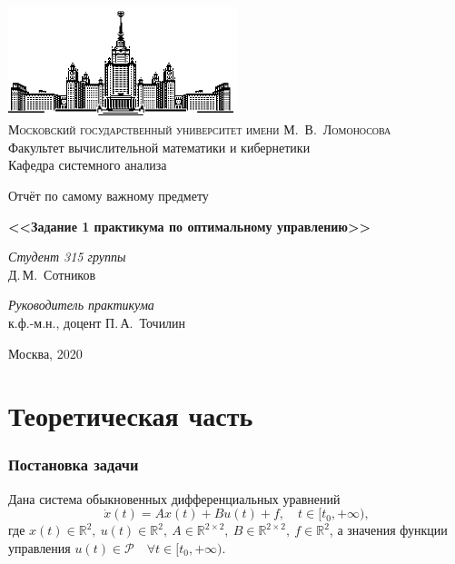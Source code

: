 \documentclass[11pt]{article}
\newcommand\Real{\mathbb{R}}
\newcommand\PS{\mathcal{P}}
\begin{document}
\thispagestyle{empty}

\begin{center}
\ \vspace{-3cm}

\includegraphics[width=0.5\textwidth]{msu.eps}\\
{\scshape Московский государственный университет имени М.~В.~Ломоносова}\\
Факультет вычислительной математики и кибернетики\\
Кафедра системного анализа

\vfill

{\LARGE Отчёт по самому важному предмету}

\vspace{1cm}

{\Huge\bfseries <<Задание 1 практикума по оптимальному управлению>>}
\end{center}

\vspace{1cm}

\begin{flushright}
  \large
  \textit{Студент 315 группы}\\
  Д.\,М.~Сотников

  \vspace{5mm}

  \textit{Руководитель практикума}\\
  к.ф.-м.н., доцент П.\,А.~Точилин
\end{flushright}

\vfill

\begin{center}
Москва, 2020
\end{center}

\newpage
\part{Теоретическая часть}
\section{Постановка задачи}

Дана система обыкновенных дифференциальных уравнений
\[
\dot{x}\left (t\right ) = A x\left (t\right ) + B u\left (t\right ) + f, \quad t \in [t_0, +\infty),
\]
где $x(t) \in \Real^2, \ u(t) \in \Real^2, \ A \in \Real^{2 \times 2}, \ B \in \Real^{2 \times 2},
 \ f \in \Real^2$, а значения функции управления $u(t) \in \PS \quad \forall t \in [t_0, +\infty)$.
\end{document}

